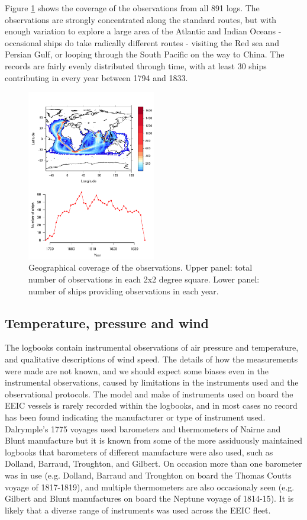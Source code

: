 \documentclass[CP]{copernicus}
\begin{document}
Figure \ref{Fsroc1} shows the coverage of the observations from all 891 logs. The observations are strongly concentrated along the standard routes, but with enough variation to explore a large area of the Atlantic and Indian Oceans - occasional ships do take radically different routes - visiting the Red sea and Persian Gulf, or looping through the South Pacific on the way to China. The records are fairly evenly distributed through time, with at least 30 ships contributing in every year between 1794 and 1833.
\begin{figure}[!hbp]
\begin{center}
\includegraphics[angle=0, width=0.5\textwidth]{fig4.pdf}
\caption{Geographical coverage of the observations. Upper panel: total number of observations in each 2x2 degree square. Lower panel: number of ships providing observations in each year.}
\label{Fsroc1}
\end{center}
\end{figure}

\subsection{Temperature, pressure and wind}

The logbooks contain instrumental observations of air pressure and temperature, and qualitative descriptions of wind speed. The details of how the measurements were made are not known, and we should expect some biases even in the instrumental observations, caused by limitations in the instruments used and the observational protocols. The model and make of instruments used on board the EEIC vessels is rarely recorded within the logbooks, and in most cases no record has been found indicating the manufacturer or type of instrument used. Dalrymple's 1775 voyages used barometers and thermometers of Nairne and Blunt manufacture \citep{Dalrymple78} but it is known from some of the more assiduously maintained logbooks that barometers of different manufacture were also used, such as Dolland, Barraud, Troughton, and Gilbert. On occasion more than one barometer was in use (e.g. Dolland, Barraud and Troughton on board the Thomas Coutts voyage of 1817-1819), and multiple thermometers are also occasionaly seen (e.g. Gilbert and Blunt manufactures on board the Neptune voyage of 1814-15). It is likely that a diverse range of instruments was used across the EEIC fleet.
\end{document}
